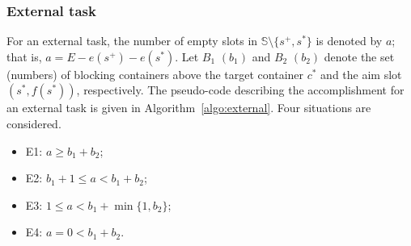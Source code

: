 \documentclass[review,3p,times,12pt,number]{elsarticle}\usepackage{amsmath}\usepackage{amssymb}
\begin{document}
\subsubsection{External task}
\label{sec:external}
For an external task, the number of empty slots in $\mathbb{S}\setminus\{s^+,s^*\}$ is denoted by $a$; that is, $a=E-e(s^+)-e(s^*)$. Let $B_1$ $(b_1)$ and $B_2$ $(b_2)$ denote the set (numbers) of blocking containers above the target container $c^*$ and the aim slot $(s^*,f(s^*))$, respectively. The pseudo-code describing the accomplishment for an external task is given in Algorithm~\ref{algo:external}. Four situations are considered.
\begin{itemize}
\item E1: $a\ge b_1+b_2$;
\item E2: $b_1+1\le a<b_1+b_2$;
\item E3: $1\le a<b_1+\min\{1,b_2\}$;
\item E4: $a=0<b_1+b_2$.
\end{itemize}
\end{document}
